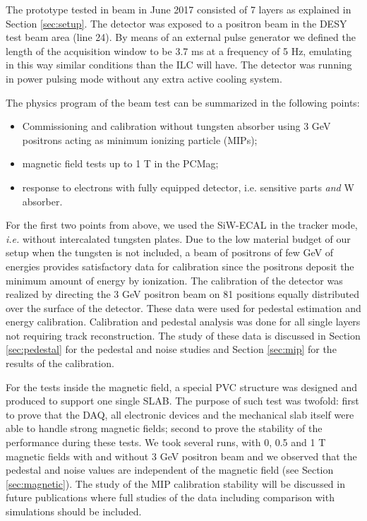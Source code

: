 \documentclass[a4paper,11pt]{article}
\begin{document}
The prototype tested in beam in June 2017 consisted of 7 layers as explained in Section \ref{sec:setup}.
The detector was exposed to a positron beam in the DESY test beam area (line 24).
By means of an external pulse generator we defined the length of the acquisition window to be
3.7 ms at a frequency of 5 Hz, emulating in this way similar conditions than the ILC will have.
The detector was running in power pulsing mode without any extra active cooling system.

The physics program of the beam test can be summarized in the following points:

\begin{itemize}
\item Commissioning and calibration without tungsten absorber using 3 GeV positrons acting as minimum ionizing particle (MIPs);
\item magnetic field tests up to 1 T in the PCMag;
\item response to electrons with fully equipped detector, i.e. sensitive parts {\it and} W absorber.
\end{itemize}

For the first two points from above, we used the SiW-ECAL in the tracker mode, {\it i.e.} without 
intercalated tungsten plates. Due to the low material budget of our setup when the tungsten is not 
included, a beam of positrons of few GeV of energies provides satisfactory data for calibration since 
the positrons deposit the minimum amount of energy by ionization.
The calibration of the detector was realized 
by directing the 3 GeV positron beam on 81 positions equally distributed over the surface of the 
detector.
These data were used for pedestal estimation and energy calibration.
Calibration and pedestal analysis was done for all single layers not requiring track reconstruction.
The study of these data is discussed in Section \ref{sec:pedestal} for the pedestal and noise studies and Section \ref{sec:mip} for the results of the calibration.

For the tests inside the magnetic field, a special PVC structure was
designed and produced to support one single SLAB.
The purpose of such test was twofold: first to prove that the DAQ, all electronic devices and the 
mechanical slab itself were able
to handle strong magnetic fields; second to prove the stability of the performance during these tests.
We took several runs, with 0, 0.5 and 1 T magnetic fields with and without 3 GeV positron beam and 
we observed that the pedestal and noise values are independent of the magnetic field (see Section 
\ref{sec:magnetic}). The study of the MIP calibration stability will be discussed in future 
publications where full studies of the data including comparison with simulations should be included.
\end{document}
